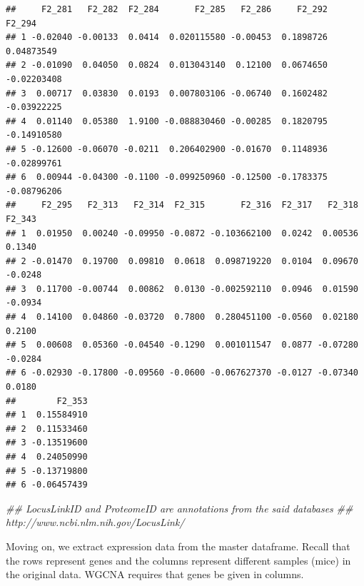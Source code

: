 \documentclass[]{article}
\newenvironment{Shaded}{\begin{snugshade}}{\end{snugshade}}
\newcommand{\CommentTok}[1]{\textcolor[rgb]{0.56,0.35,0.01}{\textit{#1}}}
\newcommand{\DecValTok}[1]{\textcolor[rgb]{0.00,0.00,0.81}{#1}}
\newcommand{\KeywordTok}[1]{\textcolor[rgb]{0.13,0.29,0.53}{\textbf{#1}}}
\newcommand{\NormalTok}[1]{#1}
\newcommand{\OperatorTok}[1]{\textcolor[rgb]{0.81,0.36,0.00}{\textbf{#1}}}
\newcommand{\StringTok}[1]{\textcolor[rgb]{0.31,0.60,0.02}{#1}}
\begin{document}
\begin{verbatim}
##     F2_281   F2_282  F2_284       F2_285   F2_286     F2_292      F2_294
## 1 -0.02040 -0.00133  0.0414  0.020115580 -0.00453  0.1898726  0.04873549
## 2 -0.01090  0.04050  0.0824  0.013043140  0.12100  0.0674650 -0.02203408
## 3  0.00717  0.03830  0.0193  0.007803106 -0.06740  0.1602482 -0.03922225
## 4  0.01140  0.05380  1.9100 -0.088830460 -0.00285  0.1820795 -0.14910580
## 5 -0.12600 -0.06070 -0.0211  0.206402900 -0.01670  0.1148936 -0.02899761
## 6  0.00944 -0.04300 -0.1100 -0.099250960 -0.12500 -0.1783375 -0.08796206
##     F2_295   F2_313   F2_314  F2_315       F2_316  F2_317   F2_318  F2_343
## 1  0.01950  0.00240 -0.09950 -0.0872 -0.103662100  0.0242  0.00536  0.1340
## 2 -0.01470  0.19700  0.09810  0.0618  0.098719220  0.0104  0.09670 -0.0248
## 3  0.11700 -0.00744  0.00862  0.0130 -0.002592110  0.0946  0.01590 -0.0934
## 4  0.14100  0.04860 -0.03720  0.7800  0.280451100 -0.0560  0.02180  0.2100
## 5  0.00608  0.05360 -0.04540 -0.1290  0.001011547  0.0877 -0.07280 -0.0284
## 6 -0.02930 -0.17800 -0.09560 -0.0600 -0.067627370 -0.0127 -0.07340  0.0180
##        F2_353
## 1  0.15584910
## 2  0.11533460
## 3 -0.13519600
## 4  0.24050990
## 5 -0.13719800
## 6 -0.06457439
\end{verbatim}

\begin{Shaded}
\begin{Highlighting}[]
\CommentTok{## LocusLinkID and ProteomeID are annotations from the said databases}
\CommentTok{## http://www.ncbi.nlm.nih.gov/LocusLink/}
\end{Highlighting}
\end{Shaded}

Moving on, we extract expression data from the master dataframe. Recall
that the rows represent genes and the columns represent different
samples (mice) in the original data. WGCNA requires that genes be given
in columns.

\begin{Shaded}
\end{Shaded}
\end{document}
